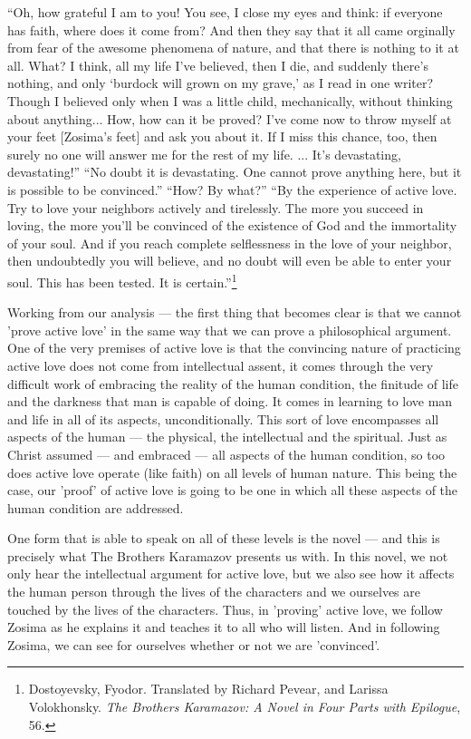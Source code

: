 ``Oh, how grateful I am to you! You see, I close my eyes and think: if everyone has faith, where does it come from? And then they say that it all came orginally from fear of the awesome phenomena of nature, and that there is nothing to it at all. What? I think, all my life I've believed, then I die, and suddenly there's nothing, and only `burdock will grown on my grave,' as I read in one writer? Though I believed only when I was a little child, mechanically, without thinking about anything... How, how can it be proved? I've come now to throw myself at your feet [Zosima's feet] and ask you about it. If I miss this chance, too, then surely no one will answer me for the rest of my life. ... It's devastating, devastating!''
``No doubt it is devastating. One cannot prove anything here, but it is possible to be convinced.''
``How? By what?''
``By the experience of active love. Try to love your neighbors actively and tirelessly. The more you succeed in loving, the more you'll be convinced of the existence of God and the immortality of your soul. And if you reach complete selflessness in the love of your neighbor, then undoubtedly you will believe, and no doubt will even be able to enter your soul. This has been tested. It is certain.''\footnote{Dostoyevsky, Fyodor. Translated by Richard Pevear, and Larissa Volokhonsky. \emph{The Brothers Karamazov: A Novel in Four Parts with Epilogue}, 56.}

Working from our analysis --- the first thing that becomes clear is that we cannot 'prove active love' in the same way that we can prove a philosophical argument. One of the very premises of active love is that the convincing nature of practicing active love does not come from intellectual assent, it comes through the very difficult work of embracing the reality of the human condition, the finitude of life and the darkness that man is capable of doing. It comes in learning to love man and life in all of its aspects, unconditionally. This sort of love encompasses all aspects of the human --- the physical, the intellectual and the spiritual. Just as Christ assumed --- and embraced --- all aspects of the human condition, so too does active love operate (like faith) on all levels of human nature. This being the case, our 'proof' of active love is going to be one in which all these aspects of the human condition are addressed. 

One form that is able to speak on all of these levels is the novel --- and this is precisely what The Brothers Karamazov presents us with. In this novel, we not only hear the intellectual argument for active love, but we also see how it affects the human person through the lives of the characters and we ourselves are touched by the lives of the characters. Thus, in 'proving' active love, we follow Zosima as he explains it and teaches it to all who will listen. And in following Zosima, we can see for ourselves whether or not we are 'convinced'.

